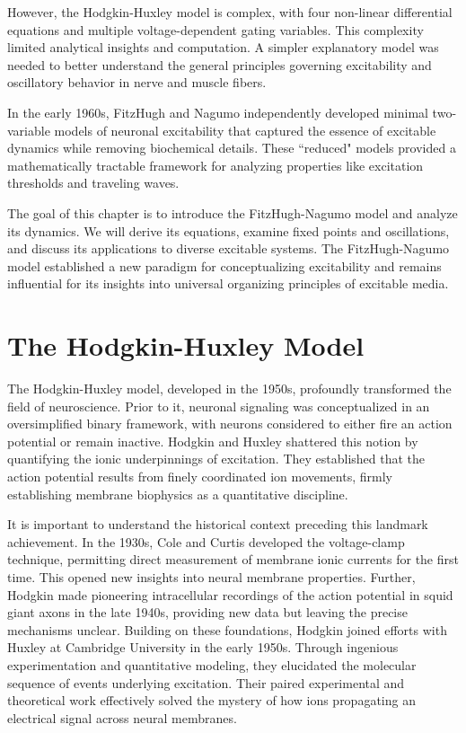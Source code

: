 However, the Hodgkin-Huxley model is complex, with four non-linear differential equations and multiple voltage-dependent gating variables. This complexity limited analytical insights and computation. A simpler explanatory model was needed to better understand the general principles governing excitability and oscillatory behavior in nerve and muscle fibers.

In the early 1960s, FitzHugh and Nagumo independently developed minimal two-variable models of neuronal excitability that captured the essence of excitable dynamics while removing biochemical details. These ``reduced" models provided a mathematically tractable framework for analyzing properties like excitation thresholds and traveling waves.

The goal of this chapter is to introduce the FitzHugh-Nagumo model and analyze its dynamics. We will derive its equations, examine fixed points and oscillations, and discuss its applications to diverse excitable systems. The FitzHugh-Nagumo model established a new paradigm for conceptualizing excitability and remains influential for its insights into universal organizing principles of excitable media.

\section{The Hodgkin-Huxley Model}

The Hodgkin-Huxley model, developed in the 1950s, profoundly transformed the field of neuroscience. Prior to it, neuronal signaling was conceptualized in an oversimplified binary framework, with neurons considered to either fire an action potential or remain inactive. Hodgkin and Huxley shattered this notion by quantifying the ionic underpinnings of excitation. They established that the action potential results from finely coordinated ion movements, firmly establishing membrane biophysics as a quantitative discipline.

It is important to understand the historical context preceding this landmark achievement. In the 1930s, Cole and Curtis developed the voltage-clamp technique, permitting direct measurement of membrane ionic currents for the first time. This opened new insights into neural membrane properties. Further, Hodgkin made pioneering intracellular recordings of the action potential in squid giant axons in the late 1940s, providing new data but leaving the precise mechanisms unclear. Building on these foundations, Hodgkin joined efforts with Huxley at Cambridge University in the early 1950s. Through ingenious experimentation and quantitative modeling, they elucidated the molecular sequence of events underlying excitation. Their paired experimental and theoretical work effectively solved the mystery of how ions propagating an electrical signal across neural membranes.


